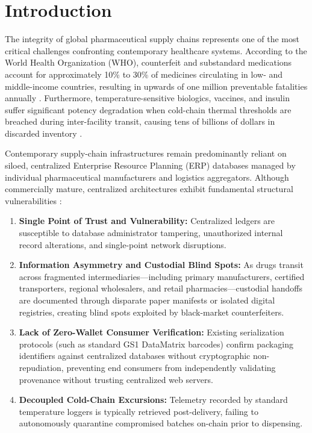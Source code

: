 \documentclass[11pt,a4paper]{article}
\begin{document}
\section{Introduction}
The integrity of global pharmaceutical supply chains represents one of the most critical challenges confronting contemporary healthcare systems. According to the World Health Organization (WHO), counterfeit and substandard medications account for approximately 10\% to 30\% of medicines circulating in low- and middle-income countries, resulting in upwards of one million preventable fatalities annually \cite{who2020counterfeit,mackey2020blockchain}. Furthermore, temperature-sensitive biologics, vaccines, and insulin suffer significant potency degradation when cold-chain thermal thresholds are breached during inter-facility transit, causing tens of billions of dollars in discarded inventory \cite{tsang2018iot}.

Contemporary supply-chain infrastructures remain predominantly reliant on siloed, centralized Enterprise Resource Planning (ERP) databases managed by individual pharmaceutical manufacturers and logistics aggregators. Although commercially mature, centralized architectures exhibit fundamental structural vulnerabilities \cite{clauson2018leveraging}:
\begin{enumerate}
    \item \textbf{Single Point of Trust and Vulnerability:} Centralized ledgers are susceptible to database administrator tampering, unauthorized internal record alterations, and single-point network disruptions.
    \item \textbf{Information Asymmetry and Custodial Blind Spots:} As drugs transit across fragmented intermediaries---including primary manufacturers, certified transporters, regional wholesalers, and retail pharmacies---custodial handoffs are documented through disparate paper manifests or isolated digital registries, creating blind spots exploited by black-market counterfeiters.
    \item \textbf{Lack of Zero-Wallet Consumer Verification:} Existing serialization protocols (such as standard GS1 DataMatrix barcodes) confirm packaging identifiers against centralized databases without cryptographic non-repudiation, preventing end consumers from independently validating provenance without trusting centralized web servers.
    \item \textbf{Decoupled Cold-Chain Excursions:} Telemetry recorded by standard temperature loggers is typically retrieved post-delivery, failing to autonomously quarantine compromised batches on-chain prior to dispensing.
\end{enumerate}
\end{document}
